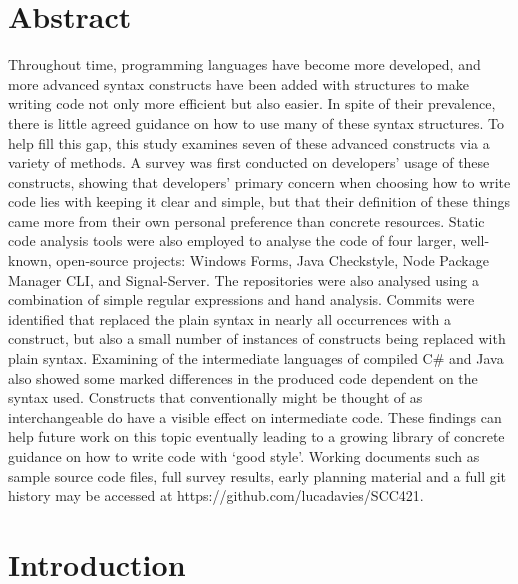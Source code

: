 \documentclass{article}
\def\mainmatter{%
    \pagenumbering{arabic}
    \setcounter{page}{1}
    \setcounter{section}{0}
    \renewcommand{\thesection}{\arabic{section}}
}%
\begin{document}
\section*{Abstract}
    Throughout time, programming languages have become more developed, and more advanced syntax constructs have been added with structures to make writing code not only more efficient but also easier. In spite of their prevalence, there is little agreed guidance on how to use many of these syntax structures. To help fill this gap, this study examines seven of these advanced constructs via a variety of methods. A survey was first conducted on developers' usage of these constructs, showing that developers' primary concern when choosing how to write code lies with keeping it clear and simple, but that their definition of these things came more from their own personal preference than concrete resources. Static code analysis tools were also employed to analyse the code of four larger, well-known, open-source projects: Windows Forms, Java Checkstyle, Node Package Manager CLI, and Signal-Server. The repositories were also analysed using a combination of simple regular expressions and hand analysis. Commits were identified that replaced the plain syntax in nearly all occurrences with a construct, but also a small number of instances of constructs being replaced with plain syntax. Examining of the intermediate languages of compiled C\# and Java also showed some marked differences in the produced code dependent on the syntax used. Constructs that conventionally might be thought of as interchangeable do have a visible effect on intermediate code. These findings can help future work on this topic eventually leading to a growing library of concrete guidance on how to write code with `good style'.
    \newline
    \newline
    Working documents such as sample source code files, full survey results, early planning material and a full git history may be accessed at https://github.com/lucadavies/SCC421.
    \newline
\newpage
\setcounter{tocdepth}{3}
\tableofcontents

\mainmatter
\newpage
\section{Introduction}
\end{document}
